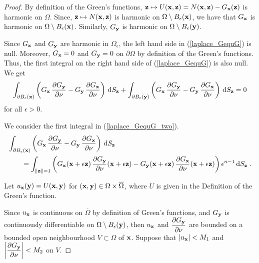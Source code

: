 \begin{proof}
By definition of the Green's functions,
$\mathbf{z} \mapsto U(\mathbf{x},\mathbf{z})
= N(\mathbf{x},\mathbf{z}) - G_{\mathbf{x}}(\mathbf{z})$
is harmonic on $\Omega$.
Since, $\mathbf{z} \mapsto N(\mathbf{x},\mathbf{z})$ is harmonic on
$\Omega \setminus B_{\epsilon}(\mathbf{x})$, we have that
$G_{\mathbf{x}}$ is harmonic on $\Omega \setminus B_{\epsilon}(\mathbf{x})$.
Similarly, $G_{\mathbf{y}}$ is harmonic on
$\Omega \setminus B_{\epsilon}(\mathbf{y})$.

Since $G_{\mathbf{x}}$ and $G_{\mathbf{y}}$ are harmonic in
$\Omega_{\epsilon}$, the left hand 
side in (\ref{laplace_GequG}) is null.  Moreover,
$G_{\mathbf{x}} = 0$ and $G_{\mathbf{y}}=0$ on $\partial \Omega$ by
definition of the Green's functions.  Thus, the first integral on the
right hand side of (\ref{laplace_GequG}) is also null.  We get
\begin{equation} \label{laplace_GequG_two}
\int_{\partial B_{\epsilon}(\mathbf{x})}
\left( G_{\mathbf{x}}\,\frac{\partial{G_{\mathbf{y}}}}{\partial \mathbf{\nu}} 
- G_{\mathbf{y}}\,\frac{\partial{G_{\mathbf{x}}}}{\partial \mathbf{\nu}} \right) \,\mathrm{d}{S}_{\mathbf{z}}
+ \int_{\partial B_{\epsilon}(\mathbf{y})}
\left( G_{\mathbf{x}}\,\frac{\partial{G_{\mathbf{y}}}}{\partial \mathbf{\nu}} 
- G_{\mathbf{y}}\,\frac{\partial{G_{\mathbf{x}}}}{\partial \mathbf{\nu}} \right) \,\mathrm{d}{S}_{\mathbf{z}} = 0
\end{equation}
for all $\epsilon >0$.

We consider the first integral in
(\ref{laplace_GequG_two}).
\begin{equation} \label{laplace_GequG_three}
\begin{split} 
&\int_{\partial B_{\epsilon}(\mathbf{x})}
\left( G_{\mathbf{x}}\,\frac{\partial{G_{\mathbf{y}}}}{\partial \mathbf{\nu}} 
- G_{\mathbf{y}}\,\frac{\partial{G_{\mathbf{x}}}}{\partial \mathbf{\nu}} \right) \,\mathrm{d}{S}_{\mathbf{z}} \\
&\qquad = \int_{\|\mathbf{z}\|=1}
\left( G_{\mathbf{x}}(\mathbf{x}+\epsilon \mathbf{z})
\,\frac{\partial{G_{\mathbf{y}}}}{\partial \mathbf{\nu}}(\mathbf{x}+\epsilon \mathbf{z})
- G_{\mathbf{y}}(\mathbf{x}+\epsilon \mathbf{z})
\,\frac{\partial{G_{\mathbf{x}}}}{\partial \mathbf{\nu}}(\mathbf{x}+\epsilon \mathbf{z}) \right)
\epsilon^{n-1}\,\mathrm{d}{S}_{\mathbf{z}} \ .
\end{split}
\end{equation}

 Let $u_{\mathbf{x}}(\mathbf{y}) = U(\mathbf{x},\mathbf{y})$ for
$(\mathbf{x},\mathbf{y}) \in \Omega \times \overline{\Omega}$, where $U$ is
given in the Definition of the Green's function.

Since $u_{\mathbf{x}}$ is continuous on $\overline{\Omega}$ by definition
of Green's functions, and $G_{\mathbf{y}}$ is continuously differentiable
on $\Omega \setminus B_{\epsilon}(\mathbf{y})$, then $u_{\mathbf{x}}$ and
$\displaystyle \frac{\partial{G_{\mathbf{y}}}}{\partial \mathbf{\nu}}$ are bounded on a
bounded open neighbourhood $V \subset \Omega$ of $\mathbf{x}$.  Suppose that
$|u_{\mathbf{x}}| < M_1$ and
$\displaystyle \left| \frac{\partial{G_{\mathbf{y}}}}{\partial \mathbf{\nu}}\right| < M_2$
on $V$.


\end{proof}
